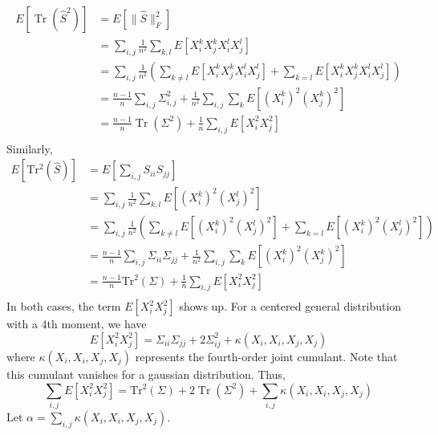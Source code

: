 \documentclass[10pt,twoside,titlepage]{article}   %
\begin{document}
\begin{equation*}
\begin{aligned}
E \left[ \operatorname{Tr}(\hat{S}^2)\right] &= E \left[ \lVert \hat{S} \rVert_F^2 \right] \\
&= \sum_{i,j} \frac{1}{n^2} \sum_{k,l} E \left[ X_i^k X_j^k X_i^l X_j^l \right] \\
&= \sum_{i,j} \frac{1}{n^2} \left( \sum_{k \neq l} E \left[ X_i^k X_j^k X_i^l X_j^l \right] + \sum_{k = l} E \left[ X_i^k X_j^k X_i^l X_j^l \right] \right) \\
&= \frac{n-1}{n} \sum_{i,j} \Sigma^2_{i,j} + \frac{1}{n^2} \sum_{i,j} \sum_k E \left[ (X_i^k)^2 (X_j^k)^2 \right] \\
&= \frac{n-1}{n} \operatorname{Tr}(\Sigma^2) + \frac{1}{n} \sum_{i,j} E \left[ X_i^2 X_j^2 \right] \\
\end{aligned}
\end{equation*}
Similarly,
\begin{equation*}
\begin{aligned}
E \left[ \operatorname{Tr^2}(\hat{S})\right] &= E \left[ \sum_{i,j} S_{ii} S_{jj} \right] \\
&= \sum_{i,j} \frac{1}{n^2} \sum_{k,l} E \left[  (X_i^k)^2  (X_j^l)^2  \right] \\
&= \sum_{i,j} \frac{1}{n^2} \left( \sum_{k \neq l} E \left[  (X_i^k)^2  (X_j^l)^2  \right] + \sum_{k = l} E \left[  (X_i^k)^2  (X_j^l)^2  \right] \right) \\
&= \frac{n-1}{n} \sum_{i,j} \Sigma_{ii} \Sigma_{jj} + \frac{1}{n^2} \sum_{i,j} \sum_k E \left[ (X_i^k)^2  (X_j^k)^2 \right] \\
&= \frac{n-1}{n} \operatorname{Tr^2}(\Sigma) + \frac{1}{n} \sum_{i,j} E \left[ X_i^2  X_j^2 \right] \\
\end{aligned}
\end{equation*}
In both cases, the term $E \left[ X_i^2  X_j^2 \right]$ shows up.
For a centered general distribution with a 4th moment, we have
\begin{equation}
E \left[ X_i^2  X_j^2 \right] = \Sigma_{ii} \Sigma_{jj} + 2 \Sigma_{ij}^2 + \kappa( X_i, X_i, X_j, X_j )
\end{equation}
where $\kappa( X_i, X_i, X_j, X_j )$ represents the fourth-order joint cumulant. 
Note that this cumulant vanishes for a gaussian distribution. 
Thus,
\begin{equation}
\label{fourth_moment_eqn}
\sum_{i,j} E \left[ X_i^2  X_j^2 \right] = \operatorname{Tr^2}(\Sigma) + 2 \operatorname{Tr}(\Sigma^2) + \sum_{i,j} \kappa( X_i, X_i, X_j, X_j )
\end{equation}
Let $\alpha =\sum_{i,j} \kappa( X_i, X_i, X_j, X_j )$. 
\end{document}
